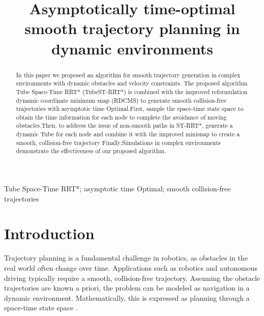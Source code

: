 \documentclass[conference]{IEEEtran}
\begin{document}
    \title
    {
        Asymptotically time-optimal smooth trajectory planning in dynamic environments\\
    }

    \author
    {
        \and
    }

    \maketitle

    \begin{abstract}
        In this paper we proposed an algorithm for smooth trajectory generation in complex environments with dynamic obstacles and velocity constraints. The proposed algorithm Tube Space-Time RRT* (TubeST-RRT*) is combined with the improved reformulation dynamic coordinate minimum snap (RDCMS) to generate smooth collision-free trajectories with asymptotic time Optimal.First, sample the space-time state space to obtain the time information for each node to complete the avoidance of moving obstacles.Then, to address the issue of non-smooth paths in ST-RRT*, generate a dynamic Tube for each node and combine it with the improved minisnap to create a smooth, collision-free trajectory Finally,Simulations in complex environments demonstrate the effectiveness of our proposed algorithm.
    \end{abstract}

    \begin{IEEEkeywords}
        Tube Space-Time RRT*; asymptotic time Optimal; smooth collision-free trajectories
    \end{IEEEkeywords}

    \section{Introduction}
        Trajectory planning is a fundamental challenge in robotics\cite{b1}, as obstacles in the real world often change over time. Applications such as robotics and autonomous driving typically require a smooth, collision-free trajectory. Assuming the obstacle trajectories are known a priori, the problem can be modeled as navigation in a dynamic environment. Mathematically, this is expressed as planning through a space-time state space \cite{b2}.
\end{document}
